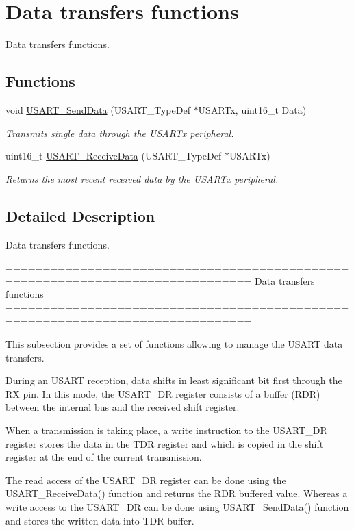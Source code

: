 \hypertarget{group___u_s_a_r_t___group2}{\section{Data transfers functions}
\label{group___u_s_a_r_t___group2}
}


Data transfers functions.  


\subsection*{Functions}
\begin{DoxyCompactItemize}
\item 
void \hyperlink{group___u_s_a_r_t___group2_ga0b43d42da9540f446d494bf69823c6fb}{U\-S\-A\-R\-T\-\_\-\-Send\-Data} (U\-S\-A\-R\-T\-\_\-\-Type\-Def $\ast$U\-S\-A\-R\-Tx, uint16\-\_\-t Data)
\begin{DoxyCompactList}\small\item\em Transmits single data through the U\-S\-A\-R\-Tx peripheral. \end{DoxyCompactList}\item 
uint16\-\_\-t \hyperlink{group___u_s_a_r_t___group2_gac67a91845b0b1d54d31bdfb1c5e9867c}{U\-S\-A\-R\-T\-\_\-\-Receive\-Data} (U\-S\-A\-R\-T\-\_\-\-Type\-Def $\ast$U\-S\-A\-R\-Tx)
\begin{DoxyCompactList}\small\item\em Returns the most recent received data by the U\-S\-A\-R\-Tx peripheral. \end{DoxyCompactList}\end{DoxyCompactItemize}


\subsection{Detailed Description}
Data transfers functions. \begin{DoxyVerb} ===============================================================================
                            Data transfers functions
 ===============================================================================  

  This subsection provides a set of functions allowing to manage the USART data 
  transfers.
  
  During an USART reception, data shifts in least significant bit first through 
  the RX pin. In this mode, the USART_DR register consists of a buffer (RDR) 
  between the internal bus and the received shift register.

  When a transmission is taking place, a write instruction to the USART_DR register 
  stores the data in the TDR register and which is copied in the shift register 
  at the end of the current transmission.

  The read access of the USART_DR register can be done using the USART_ReceiveData()
  function and returns the RDR buffered value. Whereas a write access to the USART_DR 
  can be done using USART_SendData() function and stores the written data into 
  TDR buffer.\end{DoxyVerb}
 

